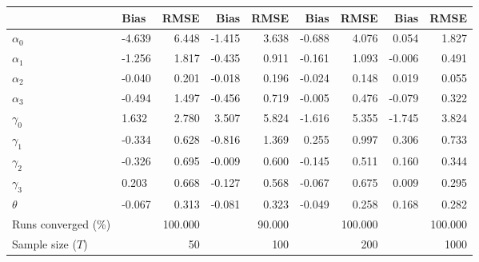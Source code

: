 
\begin{tabular}[t]{llrrrrrrr}
\toprule
  & Bias & RMSE & Bias & RMSE & Bias & RMSE & Bias & RMSE\\
\midrule
$\alpha_{0}$ & -4.639 & 6.448 & -1.415 & 3.638 & -0.688 & 4.076 & 0.054 & 1.827\\
$\alpha_{1}$ & -1.256 & 1.817 & -0.435 & 0.911 & -0.161 & 1.093 & -0.006 & 0.491\\
$\alpha_{2}$ & -0.040 & 0.201 & -0.018 & 0.196 & -0.024 & 0.148 & 0.019 & 0.055\\
$\alpha_{3}$ & -0.494 & 1.497 & -0.456 & 0.719 & -0.005 & 0.476 & -0.079 & 0.322\\
$\gamma_{0}$ & 1.632 & 2.780 & 3.507 & 5.824 & -1.616 & 5.355 & -1.745 & 3.824\\
$\gamma_{1}$ & -0.334 & 0.628 & -0.816 & 1.369 & 0.255 & 0.997 & 0.306 & 0.733\\
$\gamma_{2}$ & -0.326 & 0.695 & -0.009 & 0.600 & -0.145 & 0.511 & 0.160 & 0.344\\
$\gamma_{3}$ & 0.203 & 0.668 & -0.127 & 0.568 & -0.067 & 0.675 & 0.009 & 0.295\\
$\theta$ & -0.067 & 0.313 & -0.081 & 0.323 & -0.049 & 0.258 & 0.168 & 0.282\\
Runs converged (\%) &  & 100.000 &  & 90.000 &  & 100.000 &  & 100.000\\
Sample size ($T$) &  & 50 &  & 100 &  & 200 &  & 1000\\
\bottomrule
\end{tabular}
